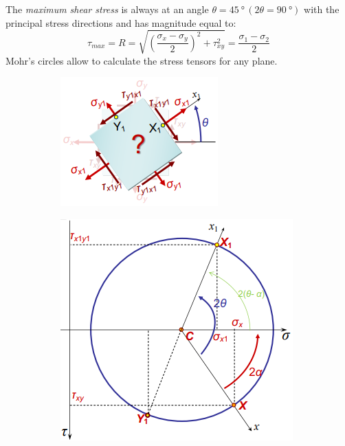 \documentclass[class=report, crop=false, 12pt,a4paper]{standalone}
\begin{document}
The \textit{maximum shear stress} is always at an angle $\theta = \SI{45}{\degree} \, (2\theta=\SI{90}{\degree})$ with the principal stress directions and has magnitude equal to:
\begin{equation}
    \tau_{max} = R = \sqrt{\left(\frac{\sigma_x - \sigma_y}{2}\right)^2 + \tau^2_{xy}} = \frac{\sigma_1-\sigma_2}{2}
\end{equation}
Mohr's circles allow to calculate the stress tensors for any plane.
\begin{figure}
    \begin{minipage}{0.49\textwidth}
        \begin{figure}[H]
            \centering
            \includegraphics[width = \textwidth]{../img/diagram60.png}
        \end{figure}
    \end{minipage}
    \begin{minipage}{0.5\textwidth}
        \begin{figure}[H]
            \centering
            \includegraphics[width = \textwidth]{../img/diagram61.png}

\end{figure}
\end{minipage}
\end{figure}
\end{document}

